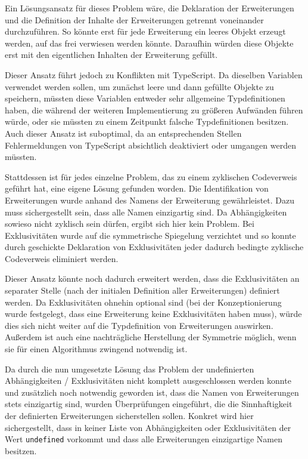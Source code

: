 Ein Lösungsansatz für dieses Problem wäre, die Deklaration der Erweiterungen und die Definition der Inhalte der Erweiterungen getrennt voneinander durchzuführen. So könnte erst für jede Erweiterung ein leeres Objekt erzeugt werden, auf das frei verwiesen werden könnte. Daraufhin würden diese Objekte erst mit den eigentlichen Inhalten der Erweiterung gefüllt.

Dieser Ansatz führt jedoch zu Konflikten mit TypeScript. Da dieselben Variablen verwendet werden sollen, um zunächst leere und dann gefüllte Objekte zu speichern, müssten diese Variablen entweder sehr allgemeine Typdefinitionen haben, die während der weiteren Implementierung zu größeren Aufwänden führen würde, oder sie müssten zu einem Zeitpunkt falsche Typdefinitionen besitzen. Auch dieser Ansatz ist suboptimal, da an entsprechenden Stellen Fehlermeldungen von TypeScript absichtlich deaktiviert oder umgangen werden müssten.

Stattdessen ist für jedes einzelne Problem, das zu einem zyklischen Codeverweis geführt hat, eine eigene Lösung gefunden worden. Die Identifikation von Erweiterungen wurde anhand des Namens der Erweiterung gewährleistet. Dazu muss sichergestellt sein, dass alle Namen einzigartig sind. Da Abhängigkeiten sowieso nicht zyklisch sein dürfen, ergibt sich hier kein Problem. Bei Exklusivitäten wurde auf die symmetrische Spiegelung verzichtet und so konnte durch geschickte Deklaration von Exklusivitäten jeder dadurch bedingte zyklische Codeverweis eliminiert werden.

Dieser Ansatz könnte noch dadurch erweitert werden, dass die Exklusivitäten an separater Stelle (nach der initialen Definition aller Erweiterungen) definiert werden. Da Exklusivitäten ohnehin optional sind (bei der Konzeptionierung wurde festgelegt, dass eine Erweiterung keine Exklusivitäten haben muss), würde dies sich nicht weiter auf die Typdefinition von Erweiterungen auswirken. Außerdem ist auch eine nachträgliche Herstellung der Symmetrie möglich, wenn sie für einen Algorithmus zwingend notwendig ist.

Da durch die nun umgesetzte Lösung das Problem der undefinierten Abhängigkeiten / Exklusivitäten nicht komplett ausgeschlossen werden konnte und zusätzlich noch notwendig geworden ist, dass die Namen von Erweiterungen stets einzigartig sind, wurden Überprüfungen eingeführt, die die Sinnhaftigkeit der definierten Erweiterungen sicherstellen sollen. Konkret wird hier sichergestellt, dass in keiner Liste von Abhängigkeiten oder Exklusivitäten der Wert \verb|undefined| vorkommt und dass alle Erweiterungen einzigartige Namen besitzen.

